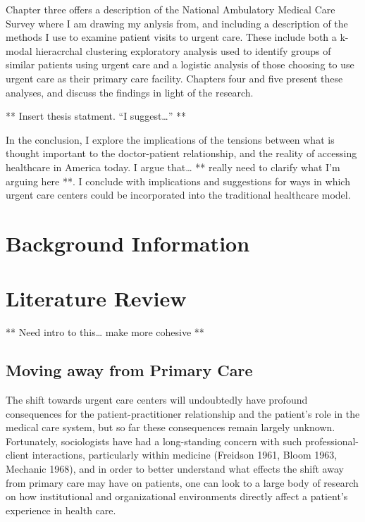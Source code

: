 \documentclass[12pt,twoside]{reedthesis}
\begin{document}
  Chapter three offers a description of the National Ambulatory Medical
  Care Survey where I am drawing my anlysis from, and including a
  description of the methods I use to examine patient visits to urgent
  care. These include both a k-modal hieracrchal clustering exploratory
  analysis used to identify groups of similar patients using urgent care
  and a logistic analysis of those choosing to use urgent care as their
  primary care facility. Chapters four and five present these analyses,
  and discuss the findings in light of the research.
  
  ** Insert thesis statment. ``I suggest\ldots{}'' **
  
  In the conclusion, I explore the implications of the tensions between
  what is thought important to the doctor-patient relationship, and the
  reality of accessing healthcare in America today. I argue that\ldots{}
  ** really need to clarify what I'm arguing here **. I conclude with
  implications and suggestions for ways in which urgent care centers could
  be incorporated into the traditional healthcare model.
  
  \chapter{Background Information}\label{background-information}
  
  \onehalfspacing
  
  \chapter{Literature Review}\label{literature-review}
  
  \onehalfspacing
  
  ** Need intro to this\ldots{} make more cohesive **
  
  \section{Moving away from Primary
  Care}\label{moving-away-from-primary-care}
  
  The shift towards urgent care centers will undoubtedly have profound
  consequences for the patient-practitioner relationship and the patient's
  role in the medical care system, but so far these consequences remain
  largely unknown. Fortunately, sociologists have had a long-standing
  concern with such professional-client interactions, particularly within
  medicine (Freidson 1961, Bloom 1963, Mechanic 1968), and in order to
  better understand what effects the shift away from primary care may have
  on patients, one can look to a large body of research on how
  institutional and organizational environments directly affect a
  patient's experience in health care.
  
\end{document}
